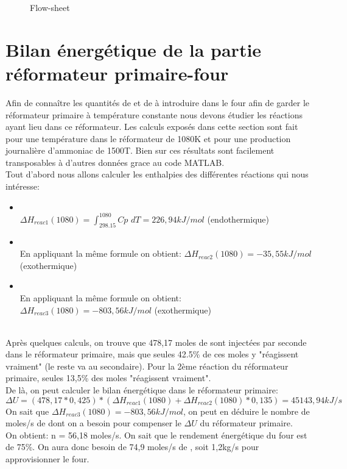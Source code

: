\documentclass[a4paper, oneside, 12pt]{article}
\begin{document}
\begin{figure}
	
	\caption{Flow-sheet}
\end{figure}


\section{Bilan énergétique de la partie réformateur primaire-four}

Afin de connaître les quantités de  et de  à introduire dans le four afin de garder le réformateur primaire à température constante nous devons étudier les réactions ayant lieu dans ce réformateur. Les calculs exposés dans cette section sont fait pour une température dans le réformateur de 1080K et pour une production journalière d'ammoniac de 1500T. Bien sur ces résultats sont facilement transposables à d'autres données grace au code MATLAB. \\
Tout d'abord nous allons calculer les enthalpies des différentes réactions qui nous intéresse: \\
\begin{itemize}
\item{ \\
$\Delta H_{reac1} (1080)=\int_{298.15}^{1080} Cp$ $dT = 226,94 kJ/mol$ (endothermique)}
\item{ \\
En appliquant la même formule on obtient: $\Delta H_{reac2} (1080) = -35,55 kJ/mol$ (exothermique)}
\item{ \\
En appliquant la même formule on obtient: $\Delta H_{reac3} (1080) = -803,56 kJ/mol$ (exothermique)}
\end{itemize}
\\
Après quelques calculs, on trouve que 478,17 moles de  sont injectées par seconde dans le réformateur primaire, mais que seules 42.5\% de ces moles y "réagissent vraiment" (le reste va au secondaire).
Pour la 2ème réaction du réformateur primaire, seules 13,5\% des moles "réagissent vraiment". \\
De là, on peut calculer le bilan énergétique dans le réformateur primaire: \\
$\Delta U = (478,17 * 0,425) * (\Delta H_{reac1} (1080) + \Delta H_{reac2} (1080) * 0,135) = 45143,94 kJ/s$ \\
On sait que $\Delta H_{reac3} (1080) = -803,56 kJ/mol$, on peut en déduire le nombre de moles/s de  dont on a besoin pour compenser le $\Delta U$ du réformateur primaire. \\
On obtient: n = 56,18 moles/s.
On sait que le rendement énergétique du four est de 75\%.
On aura donc besoin de 74,9 moles/s de , soit 1,2kg/s pour approvisionner le four. 
\end{document}
